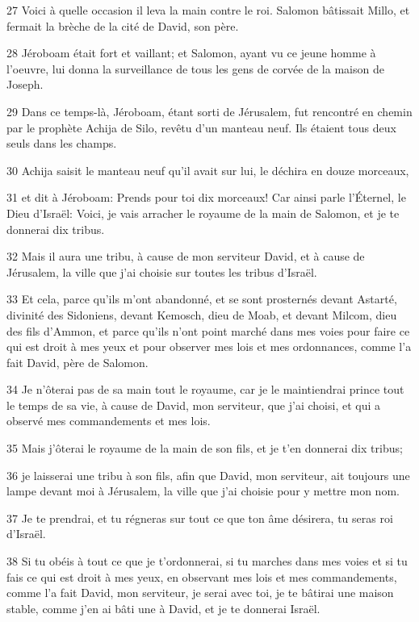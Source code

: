 \par 27 Voici à quelle occasion il leva la main contre le roi. Salomon bâtissait Millo, et fermait la brèche de la cité de David, son père.
\par 28 Jéroboam était fort et vaillant; et Salomon, ayant vu ce jeune homme à l'oeuvre, lui donna la surveillance de tous les gens de corvée de la maison de Joseph.
\par 29 Dans ce temps-là, Jéroboam, étant sorti de Jérusalem, fut rencontré en chemin par le prophète Achija de Silo, revêtu d'un manteau neuf. Ils étaient tous deux seuls dans les champs.
\par 30 Achija saisit le manteau neuf qu'il avait sur lui, le déchira en douze morceaux,
\par 31 et dit à Jéroboam: Prends pour toi dix morceaux! Car ainsi parle l'Éternel, le Dieu d'Israël: Voici, je vais arracher le royaume de la main de Salomon, et je te donnerai dix tribus.
\par 32 Mais il aura une tribu, à cause de mon serviteur David, et à cause de Jérusalem, la ville que j'ai choisie sur toutes les tribus d'Israël.
\par 33 Et cela, parce qu'ils m'ont abandonné, et se sont prosternés devant Astarté, divinité des Sidoniens, devant Kemosch, dieu de Moab, et devant Milcom, dieu des fils d'Ammon, et parce qu'ils n'ont point marché dans mes voies pour faire ce qui est droit à mes yeux et pour observer mes lois et mes ordonnances, comme l'a fait David, père de Salomon.
\par 34 Je n'ôterai pas de sa main tout le royaume, car je le maintiendrai prince tout le temps de sa vie, à cause de David, mon serviteur, que j'ai choisi, et qui a observé mes commandements et mes lois.
\par 35 Mais j'ôterai le royaume de la main de son fils, et je t'en donnerai dix tribus;
\par 36 je laisserai une tribu à son fils, afin que David, mon serviteur, ait toujours une lampe devant moi à Jérusalem, la ville que j'ai choisie pour y mettre mon nom.
\par 37 Je te prendrai, et tu régneras sur tout ce que ton âme désirera, tu seras roi d'Israël.
\par 38 Si tu obéis à tout ce que je t'ordonnerai, si tu marches dans mes voies et si tu fais ce qui est droit à mes yeux, en observant mes lois et mes commandements, comme l'a fait David, mon serviteur, je serai avec toi, je te bâtirai une maison stable, comme j'en ai bâti une à David, et je te donnerai Israël.
